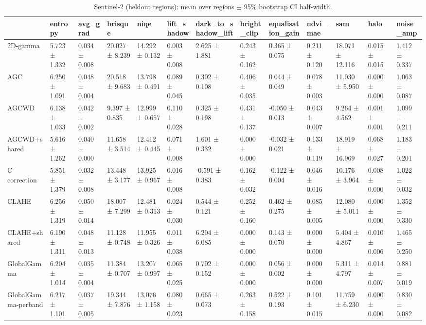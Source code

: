 \begin{table}[t]
\caption{Sentinel-2 (heldout regions): mean over regions $\pm$ 95\% bootstrap CI half-width.}
\label{tab:s2_summary_heldout}
\begin{tabular}{lllllllllllll}
\toprule
 & entropy & avg\_grad & brisque & niqe & lift\_shadow & dark\_to\_shadow\_lift & bright\_clip & equalisation\_gain & ndvi\_mae & sam & halo & noise\_amp \\
\midrule
2D-gamma & 5.723 ± 1.332 & 0.034 ± 0.008 & 20.027 ± 8.239 & 14.292 ± 0.132 & 0.003 ± 0.008 & 2.625 ± 1.881 & 0.243 ± 0.162 & 0.365 ± 0.075 & 0.211 ± 0.120 & 18.071 ± 12.116 & 0.015 ± 0.015 & 1.412 ± 0.337 \\
AGC & 6.250 ± 1.091 & 0.048 ± 0.004 & 20.518 ± 9.683 & 13.798 ± 0.491 & 0.089 ± 0.045 & 0.302 ± 0.108 & 0.406 ± 0.035 & 0.044 ± 0.049 & 0.078 ± 0.003 & 11.030 ± 5.950 & 0.000 ± 0.000 & 1.063 ± 0.087 \\
AGCWD & 6.138 ± 1.033 & 0.042 ± 0.002 & 9.397 ± 0.835 & 12.999 ± 0.657 & 0.110 ± 0.028 & 0.325 ± 0.198 & 0.431 ± 0.137 & -0.050 ± 0.013 & 0.043 ± 0.007 & 9.264 ± 4.562 & 0.001 ± 0.001 & 1.099 ± 0.211 \\
AGCWD+shared & 5.616 ± 1.262 & 0.040 ± 0.000 & 11.658 ± 3.514 & 12.412 ± 0.445 & 0.071 ± 0.008 & 1.601 ± 0.332 & 0.000 ± 0.000 & -0.032 ± 0.021 & 0.133 ± 0.119 & 18.919 ± 16.969 & 0.068 ± 0.027 & 1.183 ± 0.201 \\
C-correction & 5.851 ± 1.379 & 0.032 ± 0.008 & 13.448 ± 3.177 & 13.925 ± 0.967 & 0.016 ± 0.008 & -0.591 ± 0.383 & 0.162 ± 0.032 & -0.122 ± 0.004 & 0.046 ± 0.016 & 10.176 ± 3.964 & 0.008 ± 0.000 & 1.022 ± 0.032 \\
CLAHE & 6.256 ± 1.319 & 0.050 ± 0.014 & 18.007 ± 7.299 & 12.481 ± 0.313 & 0.024 ± 0.030 & 0.544 ± 0.121 & 0.252 ± 0.160 & 0.462 ± 0.275 & 0.085 ± 0.005 & 12.080 ± 5.011 & 0.000 ± 0.000 & 1.352 ± 0.330 \\
CLAHE+shared & 6.190 ± 1.311 & 0.048 ± 0.013 & 11.128 ± 0.748 & 11.955 ± 0.326 & 0.011 ± 0.038 & 6.204 ± 6.085 & 0.000 ± 0.000 & 0.143 ± 0.070 & 0.000 ± 0.000 & 5.404 ± 4.867 & 0.010 ± 0.006 & 1.465 ± 0.250 \\
GlobalGamma & 6.204 ± 1.014 & 0.035 ± 0.004 & 11.384 ± 0.707 & 13.207 ± 0.997 & 0.065 ± 0.025 & 0.702 ± 0.152 & 0.000 ± 0.000 & 0.056 ± 0.002 & 0.000 ± 0.000 & 5.311 ± 4.797 & 0.014 ± 0.007 & 0.881 ± 0.019 \\
GlobalGamma-perband & 6.217 ± 1.101 & 0.037 ± 0.005 & 19.344 ± 7.876 & 13.076 ± 1.158 & 0.080 ± 0.023 & 0.665 ± 0.073 & 0.263 ± 0.158 & 0.522 ± 0.193 & 0.101 ± 0.015 & 11.759 ± 6.230 & 0.000 ± 0.000 & 0.830 ± 0.082 \\

\end{tabular}
\end{table}

